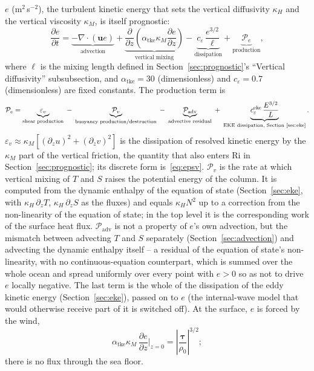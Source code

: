 \documentclass{article}
\begin{document}
$e$ (m$^2$\,s$^{-2}$), the turbulent kinetic energy that sets the vertical diffusivity $\kappa_H$ and the vertical viscosity $\kappa_M$, is itself prognostic:
\[
\frac{\partial e}{\partial t} = \underbrace{-\nabla\cdot(\mathbf{u}e)}_{\text{advection}} + \underbrace{\frac{\partial}{\partial z}\!\left(\alpha_\text{tke}\kappa_M \frac{\partial e}{\partial z}\right)}_{\text{vertical mixing}} - \underbrace{c_\varepsilon\, \frac{e^{3/2}}{\ell}}_{\text{dissipation}} + \underbrace{\mathcal{P}_e}_{\text{production}},
\]
where $\ell$ is the mixing length defined in Section~\ref{sec:prognostic}'s ``Vertical diffusivity'' subsubsection, and $\alpha_\text{tke}=30$ (dimensionless) and $c_\varepsilon=0.7$ (dimensionless) are fixed constants.
The production term is
\[
\mathcal{P}_e = \underbrace{\varepsilon_v}_{\text{shear production}} \;-\; \underbrace{\mathcal{P}_v}_{\text{buoyancy production/destruction}} \;-\; \underbrace{\mathcal{P}_\text{adv}}_{\text{advective residual}} \;+\; \underbrace{c_\varepsilon^\text{eke}\,\frac{E^{3/2}}{L}}_{\text{EKE dissipation, Section~\ref{sec:eke}}}.
\]
$\varepsilon_v \approx \kappa_M[(\partial_z u)^2 + (\partial_z v)^2]$ is the dissipation of resolved kinetic energy by the $\kappa_M$ part of the vertical friction, the quantity that also enters $\text{Ri}$ in Section~\ref{sec:prognostic}; its discrete form is~\eqref{eq:epsv}.
$\mathcal{P}_v$ is the rate at which vertical mixing of $T$ and $S$ raises the potential energy of the column. It is computed from the dynamic enthalpy of the equation of state (Section~\ref{sec:eke}, with $\kappa_H\,\partial_z T$, $\kappa_H\,\partial_z S$ as the fluxes) and equals $\kappa_H N^2$ up to a correction from the non-linearity of the equation of state; in the top level it is the corresponding work of the surface heat flux.
$\mathcal{P}_\text{adv}$ is not a property of $e$'s own advection, but the mismatch between advecting $T$ and $S$ separately (Section~\ref{sec:advection}) and advecting the dynamic enthalpy itself -- a residual of the equation of state's non-linearity, with no continuous-equation counterpart, which is summed over the whole ocean and spread uniformly over every point with $e>0$ so as not to drive $e$ locally negative.
The last term is the whole of the dissipation of the eddy kinetic energy (Section~\ref{sec:eke}), passed on to $e$ (the internal-wave model that would otherwise receive part of it is switched off).
At the surface, $e$ is forced by the wind,
\[
\alpha_\text{tke}\kappa_M\,\frac{\partial e}{\partial z}\bigg|_{z=0} = \left|\frac{\boldsymbol\tau}{\rho_0}\right|^{3/2};
\]
there is no flux through the sea floor.
\end{document}
